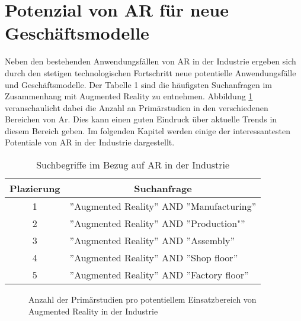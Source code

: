 \section{Potenzial von AR für neue Geschäftsmodelle}

Neben den bestehenden Anwendungsfällen von AR in der Industrie ergeben sich
durch den stetigen technologischen Fortschritt neue potentielle Anwendungsfälle
und Geschäftsmodelle. Der Tabelle 1 sind die häufigsten Suchanfragen im
Zusammenhang mit Augmented Reality zu entnehmen. Abbildung
\ref{fig:studienverteilung} veranschaulicht dabei die Anzahl an Primärstudien
in den verschiedenen Bereichen von Ar. Dies kann einen guten Eindruck über
aktuelle Trends in diesem Bereich geben. Im folgenden Kapitel werden einige der
interessantesten Potentiale von AR in der Industrie dargestellt.

\begin{table}[h]
    \centering
    \captionsetup{font=small}
    \label{tabelle1}
    \renewcommand{\arraystretch}{1.35} %

    \begin{tabular}{c|l}
        \multicolumn{1}{c|}{Plazierung} & \multicolumn{1}{c}{\centering Suchanfrage}  \\
        \hline
        1                               & ''Augmented Reality'' AND ''Manufacturing'' \\
        2                               & ''Augmented Reality'' AND ''Production"''   \\
        3                               & ''Augmented Reality'' AND ''Assembly''      \\
        4                               & ''Augmented Reality'' AND ''Shop floor''    \\
        5                               & ''Augmented Reality'' AND ''Factory floor'' \\
        \hline

    \end{tabular}
    \caption{Suchbegriffe im Bezug auf AR in der Industrie \cite{de2018augmented}}

\end{table}

\begin{figure}[h]
    \centering
    
    \caption[width=1\columnwidth]{Anzahl der Primärstudien pro potentiellem Einsatzbereich von Augmented Reality in der Industrie \cite{de2020survey}}
    \label{fig:studienverteilung}
\end{figure}

